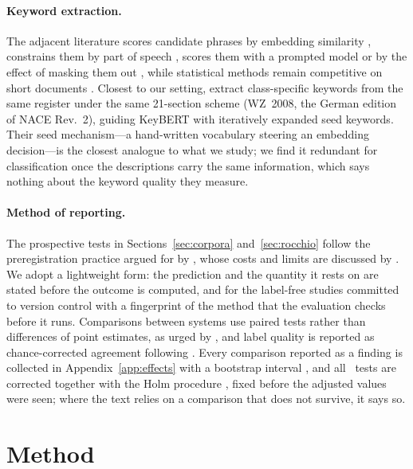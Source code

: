 \documentclass[11pt]{article}
\begin{document}
\paragraph{Keyword extraction.}
The adjacent literature scores candidate phrases by embedding similarity
\citep{grootendorst-2020-keybert}, constrains them by part of speech
\citep{schopf-etal-2022-patternrank}, scores them with a prompted model
\citep{kong-etal-2023-promptrank} or by the effect of masking them out
\citep{zhang-etal-2022-mderank}, while statistical methods remain competitive on
short documents \citep{campos-etal-2020-yake}. Closest to our setting,
\citet{meisenbacher-etal-2024-improved} extract class-specific keywords from the
same register under the same 21-section scheme (WZ~2008, the German edition of
NACE Rev.~2), guiding KeyBERT with iteratively expanded seed keywords. Their
seed mechanism---a hand-written vocabulary steering an embedding decision---is
the closest analogue to what we study; we find it redundant for classification
once the descriptions carry the same information, which says nothing about the
keyword quality they measure.

\paragraph{Method of reporting.}
The prospective tests in Sections~\ref{sec:corpora} and~\ref{sec:rocchio} follow
the preregistration practice argued for by
\citet{van-miltenburg-etal-2021-preregistering}, whose costs and limits are
discussed by \citet{sogaard-etal-2023-two}. We adopt a lightweight form: the
prediction and the quantity it rests on are stated before the outcome is
computed, and for the label-free studies committed to version control with a
fingerprint of the method that the evaluation checks before it runs.
Comparisons between systems use paired tests rather than differences of point
estimates, as urged by \citet{dror-etal-2018-hitchhikers}, and label quality is
reported as chance-corrected agreement following \citet{artstein-poesio-2008-survey}. Every comparison
reported as a finding is collected in Appendix~\ref{app:effects} with a bootstrap
interval \citep{efron-1979-bootstrap}, and all \EffectTests\ tests are corrected
together with the Holm procedure \citep{holm-1979-simple}, fixed before the
adjusted values were seen; where the text relies on a comparison that does not
survive, it says so.

\section{Method}
\end{document}
